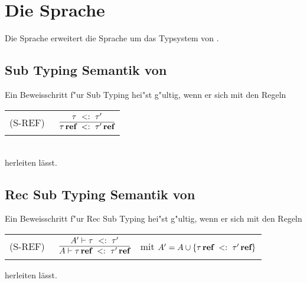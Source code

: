 \section{Die Sprache \LFOURSUB}
Die Sprache \LFOURSUB erweitert die Sprache \LTHREESUB um das Typsystem von \LFOUR. 


\subsection{Sub Typing Semantik von \LFOURSUB}

Ein Beweisschritt f"ur Sub Typing hei"st g"ultig, wenn er sich mit den Regeln  \\[5mm]
  \begin{tabular}{ll}
    \mbox{(S-REF)\ }      & $\RULE{\subtype{\tau} {\tau'} }
                              {\subtype{\reftype{\tau}} {\reftype{\tau'}}}$ \\[4mm]
   \end{tabular} \\[7mm]

herleiten l\"asst.

\subsection{Rec Sub Typing Semantik von \LFOURSUB}

Ein Beweisschritt f"ur Rec Sub Typing hei"st g"ultig, wenn er sich mit den Regeln  \\[5mm]
 \begin{tabular}{lll}
    \mbox{(S-REF)\ }      & $\RULE{A' \vdash \subtype{\tau} {\tau'} }
                              {A \vdash \subtype{\reftype{\tau}} {\reftype{\tau'}}}$ 
                                  & mit $A' = A \cup \{\tau\,\textbf{ref}\ <:\ \tau'\,\textbf{ref}\}$ \\[4mm]
          \end{tabular}


herleiten l\"asst.


